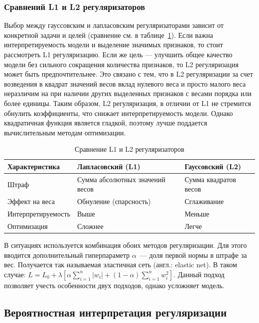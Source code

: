 \subsubsection {Сравнений L1 и L2 регуляризаторов}

Выбор между гауссовским и лапласовским регуляризаторами зависит от конкретной задачи и целей (сравнение см. в таблице~\ref{linear-reg-comp}). Если важна интерпретируемость модели и выделение значимых признаков, то стоит рассмотреть L1 регуляризацию. Если же цель — улучшить общее качество модели без сильного сокращения количества признаков, то L2 регуляризация может быть предпочтительнее. Это связано с тем, что в L2 регуляризации за счет возведения в квадрат значений весов вклад нулевого веса и просто малого веса неразличим на при наличии других выделенных признаков с весами порядка или более единицы. Таким образом, L2 регуляризация, в отличии от L1 не стремится обнулить коэффициенты, что снижает интерпретируемость модели. Однако квадратичная функция является гладкой, поэтому лучше поддается вычислительным методам оптимизации.

\begin{table}[h]
	\caption{Сравнение L1 и L2 регуляризаторов}
	\label{linear-reg-comp}
	\begin{tabular}{l|l|l}
		Характеристика & Лапласовский (L1) & Гауссовский (L2) \\
		\hline
		Штраф & Сумма абсолютных значений весов & Сумма квадратов весов \\
		Эффект на веса & Обнуление (спарсность) & Сглаживание \\
		Интерпретируемость & Выше & Меньше \\
		Оптимизация & Сложнее & Легче
	\end{tabular}
\end{table}

В ситуациях используется комбинация обоих методов регуляризации. Для этого вводится дополнительный гиперпараметр $\alpha$~--- доля первой нормы в штрафе за вес. Получается так называемая эластичная сеть (англ.: elastic net). В таком случае:
$L = L_0 + \lambda [\alpha \sum_{i=1}^{n} |w_i| + (1 - \alpha) \sum_{i=1}^{n} w_i^2]$. Данный подход позволяет учесть особенности двух подходов, однако усложняет модель.

\subsection {Вероятностная интерпретация регуляризации}
\label{linear-reg-prob}

